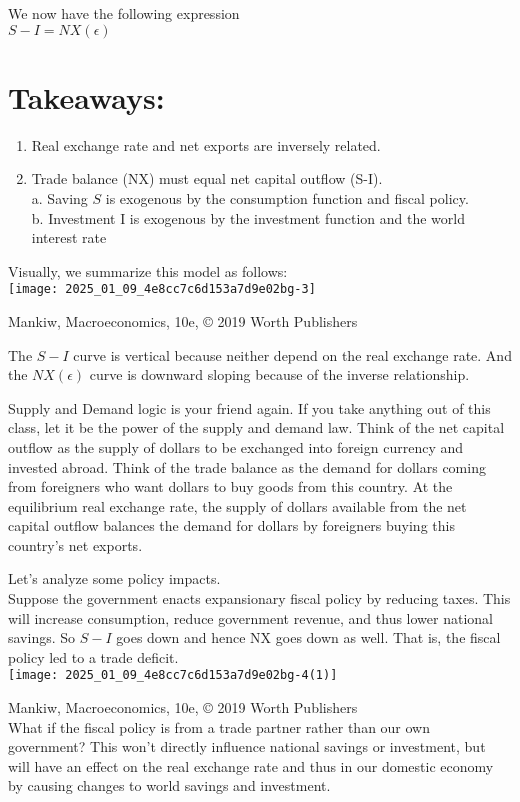 \documentclass[10pt]{article}
\begin{document}
We now have the following expression\\
$S-I=N X(\epsilon)$

\section*{Takeaways:}
\begin{enumerate}
  \item Real exchange rate and net exports are inversely related.
  \item Trade balance (NX) must equal net capital outflow (S-I).\\
a. Saving $S$ is exogenous by the consumption function and fiscal policy.\\
b. Investment I is exogenous by the investment function and the world interest rate
\end{enumerate}

Visually, we summarize this model as follows:\\
\texttt{[image: 2025\_01\_09\_4e8cc7c6d153a7d9e02bg-3]}

Mankiw, Macroeconomics, 10e, © 2019 Worth Publishers

The $S-I$ curve is vertical because neither depend on the real exchange rate. And the $N X(\epsilon)$ curve is downward sloping because of the inverse relationship.

Supply and Demand logic is your friend again. If you take anything out of this class, let it be the power of the supply and demand law. Think of the net capital outflow as the supply of dollars to be exchanged into foreign currency and invested abroad. Think of the trade balance as the demand for dollars coming from foreigners who want dollars to buy goods from this country. At the equilibrium real exchange rate, the supply of dollars available from the net capital outflow balances the demand for dollars by foreigners buying this country's net exports.

Let's analyze some policy impacts.\\
Suppose the government enacts expansionary fiscal policy by reducing taxes. This will increase consumption, reduce government revenue, and thus lower national savings. So $S-I$ goes down and hence NX goes down as well. That is, the fiscal policy led to a trade deficit.\\
\texttt{[image: 2025\_01\_09\_4e8cc7c6d153a7d9e02bg-4(1)]}

Mankiw, Macroeconomics, 10e, © 2019 Worth Publishers\\
What if the fiscal policy is from a trade partner rather than our own government? This won't directly influence national savings or investment, but will have an effect on the real exchange rate and thus in our domestic economy by causing changes to world savings and investment.
\end{document}
